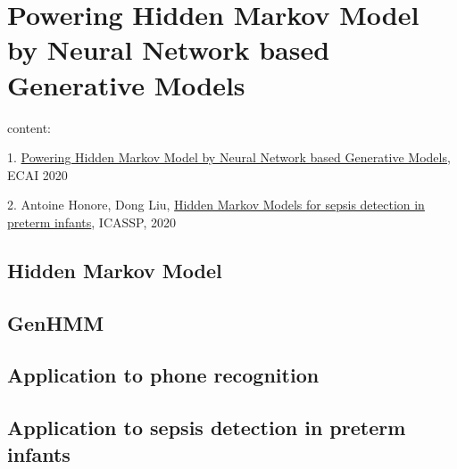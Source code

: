 \chapter{Powering Hidden Markov Model by Neural Network based Generative Models}
content:

1. \href{https://arxiv.org/abs/1910.05744}{Powering Hidden Markov Model by Neural Network based Generative Models}, ECAI 2020

2. Antoine Honore, Dong Liu, \href{https://arxiv.org/pdf/1910.13904.pdf}{Hidden Markov Models for sepsis detection in preterm infants}, ICASSP, 2020

\section{Hidden Markov Model}

\section{GenHMM}

\section{Application to phone recognition}

\section{Application to sepsis detection in preterm infants}

